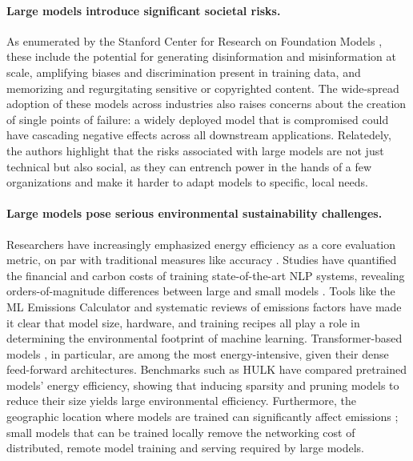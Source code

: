 \paragraph{Large models introduce significant societal risks.} As enumerated by the Stanford Center for Research on Foundation Models \citet{bommasani2021foundation}, these include the potential for generating disinformation and misinformation at scale, amplifying biases and discrimination present in training data, and memorizing and regurgitating sensitive or copyrighted content. The wide-spread adoption of these models across industries also raises concerns about the creation of single points of failure: a widely deployed model that is compromised could have cascading negative effects across all downstream applications. Relatedely, the authors highlight that the risks associated with large models are not just technical but also social, as they can entrench power in the hands of a few organizations and make it harder to adapt models to specific, local needs.

\paragraph{Large models pose serious environmental sustainability challenges.} Researchers have increasingly emphasized energy efficiency as a core evaluation metric, on par with traditional measures like accuracy \citep{schwartz2020greenai}. Studies have quantified the financial and carbon costs of training state-of-the-art NLP systems, revealing orders-of-magnitude differences between large and small models \citep{strubell2019energy}. Tools like the ML Emissions Calculator \citep{lacoste2019quantifying} and systematic reviews of emissions factors \citep{luccioni2023counting} have made it clear that model size, hardware, and training recipes all play a role in determining the environmental footprint of machine learning. Transformer-based models \citep{vaswani2017attention}, in particular, are among the most energy-intensive, given their dense feed-forward architectures. Benchmarks such as HULK \citep{zhou2021hulk} have compared pretrained models' energy efficiency, showing that inducing sparsity and pruning models to reduce their size yields large environmental efficiency. Furthermore, the geographic location where models are trained can significantly affect emissions \citep{patterson2021carbon}; small models that can be trained locally remove the networking cost of distributed, remote model training and serving required by large models. 

